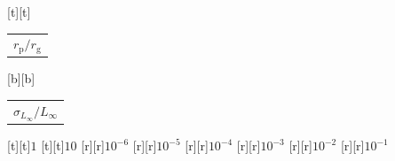 %    
%
%
\begin{psfrags}%
\psfragscanon%
%
[t][t]{\color[rgb]{0,0,0}\setlength{\tabcolsep}{0pt}\begin{tabular}{c}{\Large$r_\mathrm{p}/r_\mathrm{g}$}\end{tabular}}%
[b][b]{\color[rgb]{0,0,0}\setlength{\tabcolsep}{0pt}\begin{tabular}{c}{\Large$\sigma_{L_\infty}/L_\infty$}\end{tabular}}%
%
[t][t]{$1$}%
[t][t]{$10$}%
%
[r][r]{$10^{-6}$}%
[r][r]{$10^{-5}$}%
[r][r]{$10^{-4}$}%
[r][r]{$10^{-3}$}%
[r][r]{$10^{-2}$}%
[r][r]{$10^{-1}$}%
%
%
\end{psfrags}%
%

